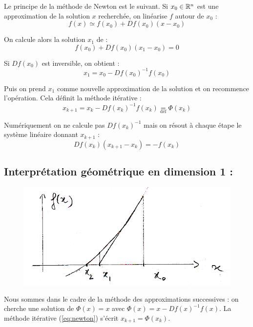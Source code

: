     Le principe de la méthode de Newton est le suivant. Si $x_0 \in \mathbb{R}^n$ est une approximation de la solution $x$ recherchée,
    on linéarise $f$ autour de $x_0$ :
    \[
        f(x) \simeq f(x_0) + Df(x_0)(x-x_0)
    \]

    On calcule alors la solution $x_1$ de :
    \[
        f(x_0) + Df(x_0)(x_1 - x_0) = 0 
    \]

    Si $Df(x_0)$ est inversible, on obtient :
    \[
        x_1 = x_0 - Df(x_0)^{-1}f(x_0)
    \]

    Puis on prend $x_1$ comme nouvelle approximation de la solution et on recommence
    l'opération. Cela définit la méthode itérative :
    \begin{equation}
        x_{k+1} = x_k - Df(x_k)^{-1}f(x_k) \underset{\text{déf}}{=} \Phi(x_k)
        \label{eq:newton}
    \end{equation}

    \begin{remark}
        Numériquement on ne calcule pas $Df(x_k)^{-1}$ mais on résout à chaque étape le
        système linéaire donnant $x_{k+1}$ :
        \[
            Df(x_k)(x_{k+1} - x_k) = -f(x_k)
        \]
    \end{remark}

    \subsection*{Interprétation géométrique en dimension 1 :}

    \begin{figure}[h]
        \centering
        \includegraphics[scale=0.5]{newton-dim1.png}
    \end{figure}

    Nous sommes dans le cadre de la méthode des approximations successives :
    on cherche une solution de $\Phi(x) = x$ avec $\Phi(x) = x - Df(x)^{-1}f(x)$.
    La méthode itérative (\ref{eq:newton}) s'écrit $x_{k+1} = \Phi(x_k)$.


